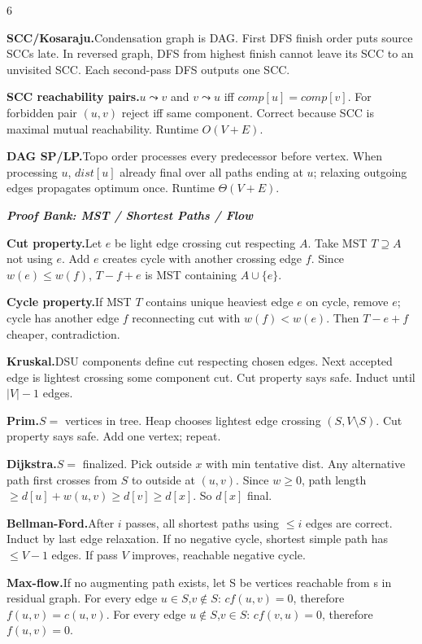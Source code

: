 \documentclass[a4paper,landscape]{article}
\newcommand{\subsectionsize}{\fontsize{3.92}{4.02}\selectfont}
\newcommand{\proofbanktitle}[1]{%
  \par\vspace{0pt}%
  {\subsectionsize\bfseries\itshape\color{rustKeyword} #1}\par%
  \vspace{0pt}%
}
\newcommand{\proofitem}[2]{%
  \par\vspace{0pt}%
  \noindent\hangindent=0.42cm\hangafter=1%
  {\bfseries\color{rustFunction} #1.}\hspace{0.055cm}#2\par%
}
\begin{document}
\begin{multicols*}{6}
\proofitem{SCC/Kosaraju}{Condensation graph is DAG. First DFS finish order puts source SCCs late. In reversed graph, DFS from highest finish cannot leave its SCC to an unvisited SCC. Each second-pass DFS outputs one SCC.}

\proofitem{SCC reachability pairs}{$u\leadsto v$ and $v\leadsto u$ iff $comp[u]=comp[v]$. For forbidden pair $(u,v)$ reject iff same component. Correct because SCC is maximal mutual reachability. Runtime $O(V+E)$.}

\proofitem{DAG SP/LP}{Topo order processes every predecessor before vertex. When processing $u$, $dist[u]$ already final over all paths ending at $u$; relaxing outgoing edges propagates optimum once. Runtime $\Theta(V+E)$.}

\proofbanktitle{Proof Bank: MST / Shortest Paths / Flow}
\proofitem{Cut property}{Let $e$ be light edge crossing cut respecting $A$. Take MST $T\supseteq A$ not using $e$. Add $e$ creates cycle with another crossing edge $f$. Since $w(e)\le w(f)$, $T-f+e$ is MST containing $A\cup\{e\}$.}

\proofitem{Cycle property}{If MST $T$ contains unique heaviest edge $e$ on cycle, remove $e$; cycle has another edge $f$ reconnecting cut with $w(f)<w(e)$. Then $T-e+f$ cheaper, contradiction.}

\proofitem{Kruskal}{DSU components define cut respecting chosen edges. Next accepted edge is lightest crossing some component cut. Cut property says safe. Induct until $|V|-1$ edges.}

\proofitem{Prim}{$S=$ vertices in tree. Heap chooses lightest edge crossing $(S,V\setminus S)$. Cut property says safe. Add one vertex; repeat.}

\proofitem{Dijkstra}{$S=$ finalized. Pick outside $x$ with min tentative dist. Any alternative path first crosses from $S$ to outside at $(u,v)$. Since $w\ge0$, path length $\ge d[u]+w(u,v)\ge d[v]\ge d[x]$. So $d[x]$ final.}

\proofitem{Bellman-Ford}{After $i$ passes, all shortest paths using $\le i$ edges are correct. Induct by last edge relaxation. If no negative cycle, shortest simple path has $\le V-1$ edges. If pass $V$ improves, reachable negative cycle.}

\proofitem{Max-flow}{If no augmenting path exists, let S be vertices reachable from s
in residual graph. For every edge $u\in S$,$v\notin S$: $cf(u,v)=0$, therefore $f(u,v)=c(u,v)$.
For every edge $u\notin S$,$v\in S$:
$cf(v,u)=0$, therefore $f(u,v)=0$.

}
\end{multicols*}
\end{document}
